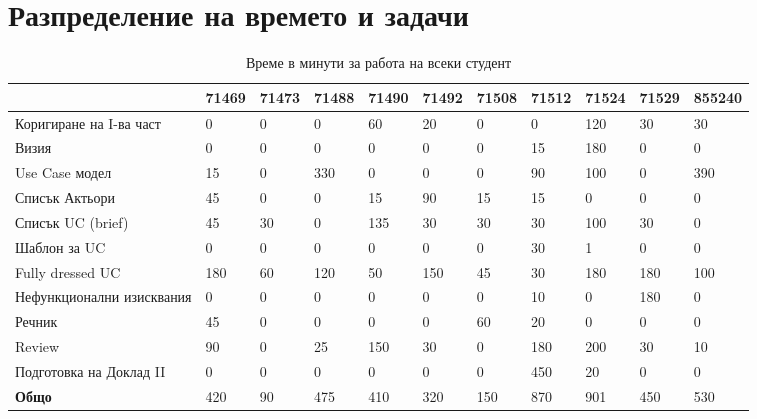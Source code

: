 \documentclass[a4paper]{article}
\begin{document}
\clearpage
\section{Разпределение на времето и задачи}
\setcounter{table}{0}

\begin{table}[h]
\centering
\label{my-label2}
\begin{tabular}{|l|l|l|l|l|l|l|l|l|l|l|}
\hline
                        	& 71469 & 71473 & 71488 & 71490 & 71492 & 71508 & 71512 & 71524 & 71529 & 855240 \\ \hline
Коригиране на I-ва част		& 0     & 0     & 0     & 60	& 20    & 0     & 0   	&  120  & 30    & 30     \\ \hline
Визия						& 0     & 0     & 0     & 0		& 0     & 0     & 15   	&  180  & 0     & 0      \\ \hline
Use Case модел				& 15    & 0     & 330   & 0		& 0     & 0     & 90   	&  100  & 0     & 390    \\ \hline
Списък Актьори				& 45    & 0     & 0     & 15	& 90    & 15    & 15   	&  0    & 0     & 0      \\ \hline
Списък UC (brief)			& 45    & 30    & 0     & 135	& 30    & 30    & 30   	&  100  & 30    & 0      \\ \hline
Шаблон за UC				& 0     & 0     & 0     & 0		& 0     & 0     & 30   	&  1    & 0     & 0      \\ \hline
Fully dressed UC			& 180   & 60    & 120   & 50	& 150   & 45    & 30   	&  180  & 180   & 100    \\ \hline
Нефункционални изисквания	& 0     & 0     & 0     & 0		& 0     & 0     & 10   	&  0    & 180   & 0      \\ \hline
Речник						& 45    & 0     & 0     & 0		& 0     & 60    & 20   	&  0    & 0     & 0      \\ \hline
Review						& 90    & 0     & 25    & 150	& 30    & 0     & 180  	&  200  & 30    & 10     \\ \hline
Подготовка на Доклад II		& 0     & 0     & 0     & 0		& 0     & 0     & 450  	&  20   & 0     & 0      \\ \hline
\textbf{Общо}				& 420   & 90    & 475   & 410	& 320   & 150   & 870  	&  901  & 450   & 530    \\ \hline
\end{tabular}
\caption{Време в минути за работа на всеки студент}
\end{table}

\clearpage
\end{document}
